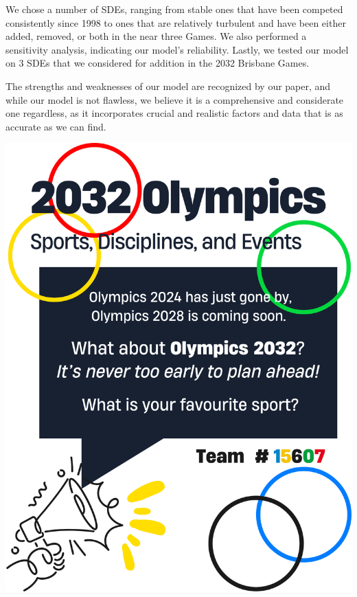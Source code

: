\documentclass[12pt]{article}
\begin{document}
We chose a number of SDEs, ranging from stable ones that have been competed consistently since 1998 to ones that are relatively turbulent and have been either added, removed, or both in the near three Games. We also performed a sensitivity analysis, indicating our model’s reliability.
Lastly, we tested our model on 3 SDEs that we considered for addition in the 2032 Brisbane Games.

The strengths and weaknesses of our model are recognized by our paper, and while our model is not flawless, we believe it is a comprehensive and considerate one regardless, as it incorporates crucial and realistic factors and data that is as accurate as we can find.

\newpage

\clearpage


\newpage %
\thispagestyle{empty} %
\noindent %
    \includegraphics[width=\textwidth, height=\textheight, keepaspectratio]{Olympic.png}

\newpage %
\end{document}
